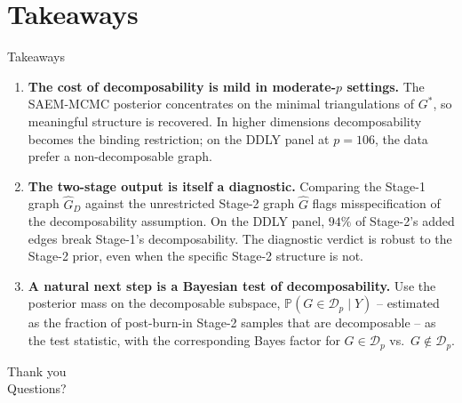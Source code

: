 \section{Takeaways}

\begin{frame}[t]{Takeaways}
    \vspace{0.2cm}
    \begin{enumerate}
        \item[\textbf{1.}] \textbf{The cost of decomposability is mild in moderate-$p$ settings.} The SAEM-MCMC posterior concentrates on the minimal triangulations of $G^*$, so meaningful structure is recovered. In higher dimensions decomposability becomes the binding restriction; on the DDLY panel at $p = 106$, the data prefer a non-decomposable graph.
        \vspace{0.25cm}
        \item[\textbf{2.}] \textbf{The two-stage output is itself a diagnostic.} Comparing the Stage-1 graph $\hat G_D$ against the unrestricted Stage-2 graph $\hat G$ flags misspecification of the decomposability assumption. On the DDLY panel, $94\%$ of Stage-2's added edges break Stage-1's decomposability. The diagnostic verdict is robust to the Stage-2 prior, even when the specific Stage-2 structure is not.
        \vspace{0.25cm}
        \item[\textbf{3.}] \textbf{A natural next step is a Bayesian test of decomposability.} Use the posterior mass on the decomposable subspace, $\mathbb{P}(G \in \mathcal{D}_p \mid Y)$ -- estimated as the fraction of post-burn-in Stage-2 samples that are decomposable -- as the test statistic, with the corresponding Bayes factor for $G \in \mathcal{D}_p$ vs.\ $G \notin \mathcal{D}_p$.
    \end{enumerate}
\end{frame}

\begin{frame}[plain]
    \begin{center}
        \vspace{1.5cm}
        {\Large Thank you}\\[0.6cm]

        \large Questions?
    \end{center}
\end{frame}


